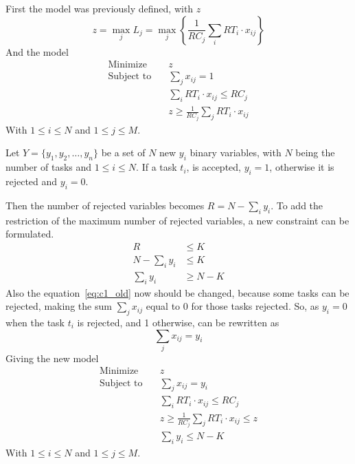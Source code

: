 \documentclass[11pt,a4paper]{article}
\begin{document}
First the model was previously defined, with $z$
\begin{equation}
  z = \max_j L_j
  = \max_j \left\{ \frac{1}{RC_j} \sum_{i}{RT_i \cdot x_{ij}} \right\}
\end{equation}
And the model
\begin{align}
\text{Minimize}   \quad & z\\
\text{Subject to} \quad & \sum_j x_{ij} = 1 \label{eq:c1_old}\\
& \sum_i RT_i \cdot x_{ij} \le RC_j \\
& z \ge \frac{1}{RC_j} \sum_{j}{RT_i \cdot x_{ij}}
\end{align}
With $1 \le i \le N$ and $1 \le j \le M$.

Let $Y = \{y_1, y_2,\ldots,y_n \}$ be a set of $N$ new $y_i$ binary variables, 
with $N$ being the number of tasks and $1 \le i \le N$. If a task $t_i$, is 
accepted, $y_i = 1$, otherwise it is rejected and $y_i = 0$. 

Then the number of rejected variables becomes $R = N - \sum_i y_i$. To add the 
restriction of the maximum number of rejected variables, a new constraint can be 
formulated.
\begin{align}
R &\le K \nonumber \\
N - \sum_i y_i &\le K \nonumber \\
\sum_i y_i &\ge N - K
\end{align}
%
Also the equation~\eqref{eq:c1_old} now should be changed, because some tasks 
can be rejected, making the sum $\sum_j x_{ij}$ equal to 0 for those tasks 
rejected.  So, as $y_i = 0$ when the task $t_i$ is rejected, and 1 otherwise, 
can be rewritten as
\begin{equation}
\sum_j x_{ij} = y_i
\end{equation}
Giving the new model
\begin{align}
\text{Minimize}   \quad & z\\
\text{Subject to} \quad & \sum_j x_{ij} = y_i \\
& \sum_i RT_i \cdot x_{ij} \le RC_j \\
& z \ge \frac{1}{RC_j} \sum_{j}{RT_i \cdot x_{ij}} \le z\\
& \sum_i y_i \le N - K
\end{align}
With $1 \le i \le N$ and $1 \le j \le M$.
\end{document}

